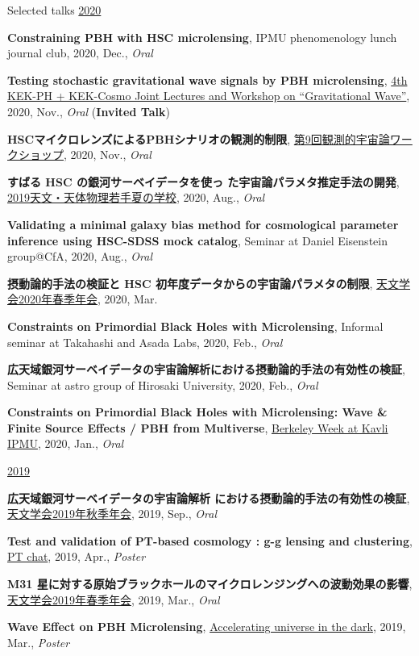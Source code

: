 \begin{rSection}{Selected talks}
\underline{2020}
\begin{etaremune}
\setcounter{enumi}{16}
\item \textbf{Constraining PBH with HSC microlensing}, IPMU phenomenology lunch journal club, 2020, Dec., \textit{Oral}
\item \textbf{Testing stochastic gravitational wave signals by PBH microlensing}, \href{http://conference-indico.kek.jp/event/117/timetable/#day-2020-11-04}{4th KEK-PH + KEK-Cosmo Joint Lectures and Workshop on ``Gravitational Wave''}, 2020, Nov., \textit{Oral} (\textbf{Invited Talk})
\item \textbf{HSCマイクロレンズによるPBHシナリオの観測的制限}, \href{https://indico.ipmu.jp/event/382/timetable/#all}{第9回観測的宇宙論ワークショップ}, 2020, Nov., \textit{Oral}
\item \textbf{すばる HSC の銀河サーベイデータを使っ た宇宙論パラメタ推定手法の開発}, \href{http://www.astro-wakate.org/ss2019/web/}{2019天文・天体物理若手夏の学校}, 2020, Aug., \textit{Oral}
\item \textbf{Validating a minimal galaxy bias method for cosmological parameter inference using HSC-SDSS mock catalog}, Seminar at Daniel Eisenstein group@CfA, 2020, Aug., \textit{Oral}
\item \textbf{摂動論的手法の検証と HSC 初年度データからの宇宙論パラメタの制限}, \href{http://www.asj.or.jp/nenkai/archive/2020a/pdf/U03a.pdf}{天文学会2020年春季年会}, 2020, Mar.
\item \textbf{Constraints on Primordial Black Holes with Microlensing}, Informal seminar at Takahashi and Asada Labs, 2020, Feb., \textit{Oral}
\item \textbf{広天域銀河サーベイデータの宇宙論解析における摂動論的手法の有効性の検証}, Seminar at astro group of Hirosaki University, 2020, Feb., \textit{Oral}
\item \textbf{Constraints on Primordial Black Holes with Microlensing: Wave \& Finite Source Effects / PBH from Multiverse}, \href{http://indico.ipmu.jp/event/313/overview}{Berkeley Week at Kavli IPMU}, 2020, Jan., \textit{Oral}
\end{etaremune}

\underline{2019}
\begin{etaremune}
\setcounter{enumi}{7}
\item \textbf{広天域銀河サーベイデータの宇宙論解析 における摂動論的手法の有効性の検証}, \href{https://www.asj.or.jp/nenkai/archive/2019b/pdf/U20a.pdf}{天文学会2019年秋季年会}, 2019, Sep., \textit{Oral}
\item \textbf{Test and validation of PT-based cosmology : g-g lensing and clustering}, \href{http://pt-chat-kyoto.sciencesconf.org/}{PT chat}, 2019, Apr., \textit{Poster}
\item \textbf{M31 星に対する原始ブラックホールのマイクロレンジングへの波動効果の影響}, \href{https://www.asj.or.jp/nenkai/archive/2019a/pdf/U14a.pdf}{天文学会2019年春季年会}, 2019, Mar., \textit{Oral}
\item \textbf{Wave Effect on PBH Microlensing}, \href{http://www2.yukawa.kyoto-u.ac.jp/~aud2019/index.php}{Accelerating universe in the dark}, 2019, Mar., \textit{Poster}
\end{etaremune}


\end{rSection}
